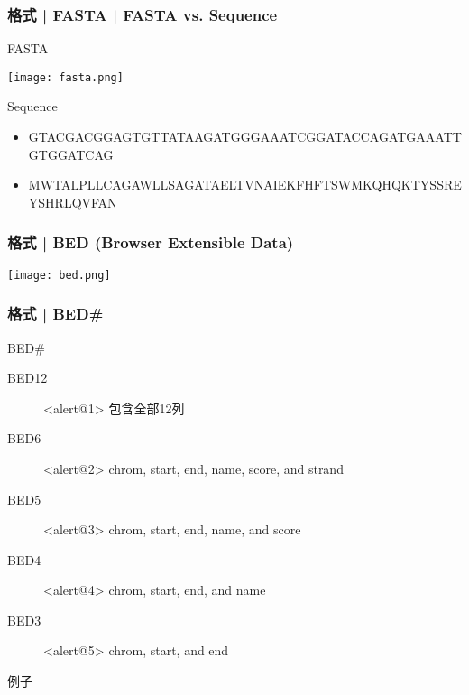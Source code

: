 \documentclass[table]{beamer}
\begin{document}
\begin{frame}
  \frametitle{格式 | FASTA | FASTA vs. Sequence}
  \begin{block}{FASTA}
    \begin{center}
      \texttt{[image: fasta.png]}
    \end{center}
  \end{block}
  \begin{block}{Sequence}
    \begin{itemize}
      \item {\scriptsize GTACGACGGAGTGTTATAAGATGGGAAATCGGATACCAGATGAAATTGTGGATCAG}
      \item {\scriptsize MWTALPLLCAGAWLLSAGATAELTVNAIEKFHFTSWMKQHQKTYSSREYSHRLQVFAN}
    \end{itemize}
  \end{block}
\end{frame}

\begin{frame}
  \frametitle{格式 | BED (Browser Extensible Data)}
    \begin{center}
      \texttt{[image: bed.png]}
    \end{center}
\end{frame}

\begin{frame}
  \frametitle{格式 | BED\#}
  \begin{block}{BED\#}
  \begin{description}
    \item[BED12]<alert@1> 包含全部12列
    \item[BED6]<alert@2> chrom, start, end, name, score, and strand
    \item[BED5]<alert@3> chrom, start, end, name, and score
    \item[BED4]<alert@4> chrom, start, end, and name
    \item[BED3]<alert@5> chrom, start, and end
  \end{description}
\end{block}
\begin{block}{例子}
  \end{block}
\end{frame}
\end{document}
